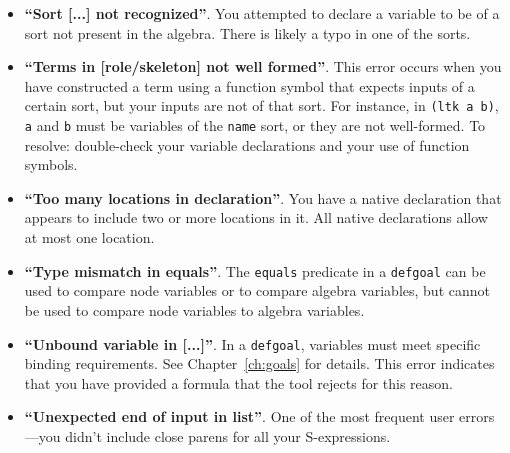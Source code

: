 \begin{itemize}

\item \textbf{``Sort [...] not recognized''}.  You attempted to declare a variable
  to be of a sort not present in the algebra. There is likely a typo
  in one of the sorts.

\item \textbf{``Terms in [role/skeleton] not well formed''}.  This error occurs
  when you have constructed a term using a function symbol that
  expects inputs of a certain sort, but your inputs are not of that
  sort.  For instance, in \texttt{(ltk a b)}, \texttt{a} and
  \texttt{b} must be variables of the \texttt{name} sort, or they are not
  well-formed.  To resolve: double-check your variable declarations and
  your use of function symbols.


\item \textbf{``Too many locations in declaration''}.  You have a
  native declaration that appears to include two or more
  locations in it.  All native declarations allow at most one
  location.

\item \textbf{``Type mismatch in equals''}.  The \texttt{equals} predicate
  in a \texttt{defgoal} can be used to compare node variables or to compare
  algebra variables, but cannot be used to compare node variables to algebra
  variables.

\item \textbf{``Unbound variable in [...]''}.  In a \texttt{defgoal},
  variables must meet specific binding requirements.  See Chapter~\ref{ch:goals}
  for details.  This error indicates that you have provided a formula that the
  tool rejects for this reason.

\item \textbf{``Unexpected end of input in list''}.  One of the most frequent
  user errors---you didn't include close parens for all your S-expressions.

\end{itemize}

